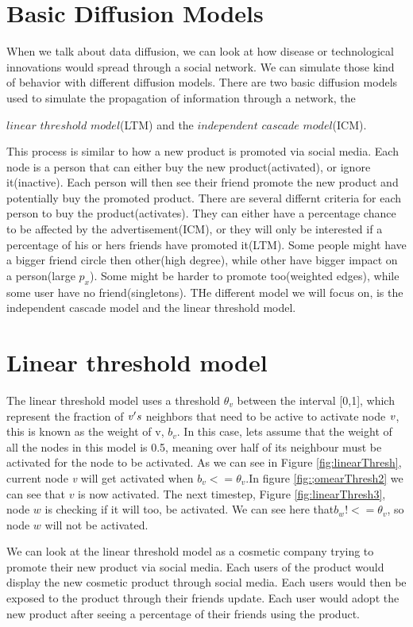 \section{Basic Diffusion Models}
When we talk about data diffusion, we can look at how disease or technological innovations would spread through a social network. We can simulate those kind of behavior with different diffusion models. There are two basic diffusion models used to simulate the propagation of information through a network\cite{MaximizeSpread2003}, the {$linear$ $threshold$ $model$(LTM) and the $ independent$ $cascade$ $model$(ICM)\cite{MaximizeSpread2003}.

This process is similar to how a new product is promoted via social media. Each node is a person that can either buy the new product(activated), or ignore it(inactive). Each person will then see their friend promote the new product and potentially buy the promoted product. There are several differnt criteria for each person to buy the product(activates). They can either have a percentage chance to be affected by the advertisement(ICM), or they will only be interested if a percentage of his or hers friends have promoted it(LTM). Some people might have a bigger friend circle then other(high degree), while other have bigger impact on a person(large $p_x$). Some might be harder to promote too(weighted edges), while some user have no friend(singletons). THe different model we will focus on, is the independent cascade model and the linear threshold model.

\section{Linear threshold model}
The linear threshold model uses a threshold $\theta_v$ between the interval [0,1], which represent the fraction of $\it{v}'s$ neighbors that need to be active to activate node $\it{v}$, this is known as the weight of v, $b_v$. In this case, lets assume that the weight of all the nodes in this model is 0.5, meaning over half of its neighbour must be activated for the node to be activated. As we can see in Figure \ref{fig:linearThresh}, current node {\it v} will get activated when $b_v <= \theta_v$.In figure \ref{fig:;omearThresh2} we can see that $v$ is now activated. The next timestep, Figure \ref{fig:linearThresh3}, node $w$ is checking if it will too, be activated. We can see here that$b_w !<= \theta_v$, so node $w$ will not be activated.  

We can look at the linear threshold model as a cosmetic company trying to promote their new product via social media. Each users of the product would display the new cosmetic product through social media. Each users would then be exposed to the product through their friends update. Each user would adopt the new product after seeing a percentage of their friends using the product. 

}
